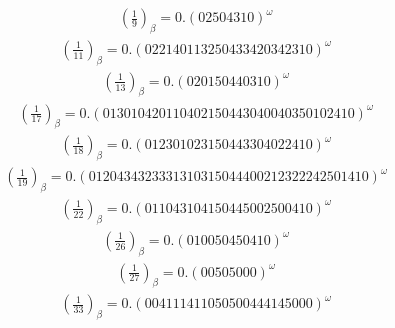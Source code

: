 \documentclass[fleqn]{article}
\begin{document}
\begin{equation*}
\begin{split}
(\frac{1}{9})_\beta = 0.(02504310)^\omega
\end{split}\end{equation*}
\begin{equation*}
\begin{split}
(\frac{1}{11})_\beta = 0.(022140113250433420342310)^\omega
\end{split}\end{equation*}
\begin{equation*}
\begin{split}
(\frac{1}{13})_\beta = 0.(020150440310)^\omega
\end{split}\end{equation*}
\begin{equation*}
\begin{split}
(\frac{1}{17})_\beta = 0.(013010420110402150443040040350102410)^\omega
\end{split}\end{equation*}
\begin{equation*}
\begin{split}
(\frac{1}{18})_\beta = 0.(012301023150443304022410)^\omega
\end{split}\end{equation*}
\begin{equation*}
\begin{split}
(\frac{1}{19})_\beta = 0.(0120434323331310315044400212322242501410)^\omega
\end{split}\end{equation*}
\begin{equation*}
\begin{split}
(\frac{1}{22})_\beta = 0.(011043104150445002500410)^\omega
\end{split}\end{equation*}
\begin{equation*}
\begin{split}
(\frac{1}{26})_\beta = 0.(010050450410)^\omega
\end{split}\end{equation*}
\begin{equation*}
\begin{split}
(\frac{1}{27})_\beta = 0.(00505000)^\omega
\end{split}\end{equation*}
\begin{equation*}
\begin{split}
(\frac{1}{33})_\beta = 0.(004111411050500444145000)^\omega
\end{split}\end{equation*}
\end{document}
